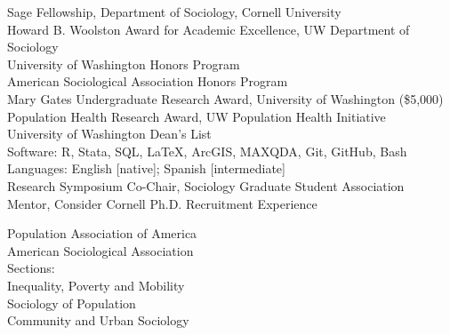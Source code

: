 \documentclass[11pt]{article} %
\begin{document}
 Sage Fellowship, Department of Sociology, Cornell University \\
 Howard B. Woolston Award for Academic Excellence, UW Department of Sociology \\
 University of Washington Honors Program \\
 American Sociological Association Honors Program \\
 Mary Gates Undergraduate Research Award, University of Washington (\$5,000)	\\	
 Population Health Research Award, UW Population Health Initiative 	\\
 University of Washington Dean’s List \\					     

Software: R, Stata, SQL, \LaTeX, ArcGIS, MAXQDA, Git, GitHub, Bash \\
Languages: English [native]; Spanish [intermediate] \\

 Research Symposium Co-Chair, Sociology Graduate Student Association \\
 Mentor, Consider Cornell Ph.D. Recruitment Experience \\
\smallskip 

Population Association of America \\
American Sociological Association \\
Sections: \\
\hspace*{10mm} Inequality, Poverty and Mobility \\
\hspace*{10mm} Sociology of Population \\
\hspace*{10mm} Community and Urban Sociology \\
\end{document}
